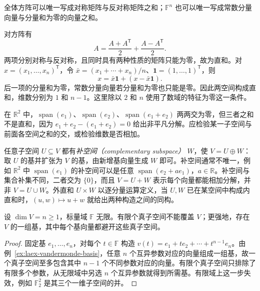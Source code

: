 \begin{example}
\label{ex:laex-direct-decompositions}
全体方阵可以唯一写成对称矩阵与反对称矩阵之和；$\mathbb F^n$ 也可以唯一写成常数分量向量与分量和为零的向量之和。
\end{example}

\begin{solve}
对方阵有
\[
A=\frac{A+A^{\mathsf T}}2+\frac{A-A^{\mathsf T}}2.
\]
两项分别对称与反对称，且同时具有两种性质的矩阵只能为零，故为直和。对 $x=(x_1,\ldots,x_n)^{\mathsf T}$，令 $\bar x=(x_1+\cdots+x_n)/n$、$\mathbf1=(1,\ldots,1)^{\mathsf T}$，则
\[
x=\bar x\mathbf1+(x-\bar x\mathbf1).
\]
后一项的分量和为零，常数分量向量若分量和为零也只能是零。因此两空间构成直和，维数分别为 $1$ 和 $n-1$。这里除以 $2$ 和 $n$ 使用了数域的特征为零这一条件。
\end{solve}

\begin{notealert}[type=caution,title={多于两个子空间时不能只检验两两相交为零}]
在 $\mathbb R^2$ 中，$\operatorname{span}(e_1)$、$\operatorname{span}(e_2)$、$\operatorname{span}(e_1+e_2)$ 两两交为零，但三者之和不是直和，因为 $e_1+e_2-(e_1+e_2)=0$ 给出非平凡分解。应检验某一子空间与前面各空间之和的交，或检验维数是否相加。
\end{notealert}

任意子空间 $U\subseteq V$ 都有\emph{补空间（complementary subspace）} $W$，使 $V=U\oplus W$：取 $U$ 的基并扩张为 $V$ 的基，由新增基向量生成 $W$ 即可。补空间通常不唯一，例如 $\mathbb R^2$ 中 $\operatorname{span}(e_1)$ 的补空间可以是任意 $\operatorname{span}(e_2+ae_1)$，$a\in\mathbb R$。补空间与集合补集不同，二者交为 $\{0\}$，而且 $V=U+W$ 表示每个向量都能相加分解，并非 $V=U\cup W$。外直和 $U\times W$ 以逐分量运算定义，当 $U,W$ 已在某空间中构成内直和时，$(u,w)\mapsto u+w$ 就给出两种构造之间的同构。

\begin{proposition}
\label{prop:laex-finite-union}
设 $\dim V=n\ge1$，标量域 $\mathbb F$ 无限。有限个真子空间不能覆盖 $V$；更强地，存在 $V$ 的一组基，其中每个基向量都避开这些真子空间。
\end{proposition}

\begin{proof}
固定基 $e_1,\ldots,e_n$，对每个 $t\in\mathbb F$ 构造 $v(t)=e_1+te_2+\cdots+t^{n-1}e_n$。由例~\ref{ex:laex-vandermonde-basis}，任意 $n$ 个互异参数对应的向量组成一组基，故一个真子空间至多包含其中 $n-1$ 个不同参数对应的向量。有限个真子空间只排除了有限多个参数，从无限域中另选 $n$ 个互异参数就得到所需基。有限域上这一步失效，例如 $\mathbb F_2^2$ 是其三个一维子空间的并。
\end{proof}

